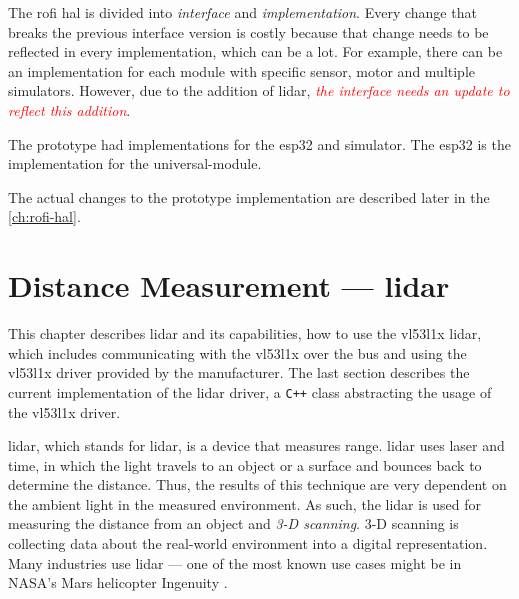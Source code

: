 \documentclass[
  digital,     %
  oneside,     %
  nosansbold,  %
  nocolorbold, %
  nolof,         %
  nolot,         %
]{fithesis4}
\newcommand{\TODO}[1]{\textcolor{red}{\textit{#1}}}
\newcommand{\TODOLIST}[1]{}
\begin{document}
{{{The \acrshort{rofi} \acrshort{hal} is divided into \emph{interface} and \emph{implementation}. Every change that breaks the previous interface version is costly because that change needs to be reflected in every implementation, which can be a lot. For example, there can be an implementation for each module with specific sensor, motor and multiple simulators. However, due to the addition of \acrshort{lidar}, \TODO{the interface needs an update to reflect this addition}.

The prototype had implementations for the esp32 and simulator. The esp32 is the implementation for the \gls{universal-module}.

The actual changes to the prototype implementation are described later in the \autoref{ch:rofi-hal}.

\chapter[ Distance Measurement --- LiDAR ]{ Distance Measurement --- \acrshort{lidar} } \label{sec:lidar}
\TODOLIST{
\begin{itemize}
    \item \TODO{Walk through \acrshort{lidar} features}
    \item \TODO{Communicating by \acrshort{i2c}}
    \item \TODO{\acrshort{lidar} protocol}
\end{itemize}
}
This chapter describes \acrshort{lidar} and its capabilities, how to use the \gls{vl53l1x} \acrshort{lidar}, which includes communicating with the \gls{vl53l1x} over the bus and using the \gls{vl53l1x} driver provided by the manufacturer. The last section describes the current implementation of the \acrshort{lidar} driver, a \verb|C++| class abstracting the usage of the \gls{vl53l1x} driver.  

\acrshort{lidar}, which stands for \acrlong{lidar}, is a device that measures range. \acrshort{lidar} uses laser and time, in which the light travels to an object or a surface and bounces back to determine the distance. Thus, the results of this technique are very dependent on the ambient light in the measured environment. As such, the \acrshort{lidar} is used for measuring the distance from an object and \emph{3-D scanning}. 3-D scanning is collecting data about the real-world environment into a digital representation. Many industries use \acrshort{lidar} --- one of the most known use cases might be in NASA's Mars helicopter Ingenuity \cite{garmin-lidar}.

}}}
\end{document}
